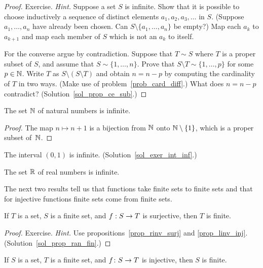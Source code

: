\begin{proof} Exercise. \emph{Hint.}  Suppose a set $S$ is infinite. Show that it is possible to
choose inductively a sequence of distinct elements $a_1, a_2, a_3,\dots$ in $S$. (Suppose
$a_1,\dots,a_n$ have already been chosen. Can $S \setminus \{a_1,\dots,a_n\}$ be empty?)  Map
each $a_k$ to $a_{k+1}$ and map each member of $S$ which is not an $a_k$ to itself.

For the converse argue by contradiction.  Suppose that $T \sim S$ where $T$ is a proper subset
of $S$, and assume that $S \sim \{1,\dots,n\}$.  Prove that $S \setminus T \sim \{1,\dots,p\}$
for some $p \in \mathbb{N}$. Write $T$ as $S \setminus (S \setminus T)$ and obtain $n = n - p$ by
computing the cardinality of $T$ in two ways. (Make use of problem~\ref{prob_card_diff}.) What
does $n = n - p$ contradict?  (Solution~\ref{sol_prop_ce_sub}.)  \ns
\end{proof}

\begin{exam} The set $\mathbb{N}$ of natural numbers is infinite.
\end{exam}

\begin{proof}  The map $n \mapsto n + 1$ is a bijection from $\mathbb{N}$ onto $\mathbb{N} \setminus \{1\}$,
which is a proper subset of~$\mathbb{N}$.
\end{proof}

\begin{exer}\label{exer_int_inf}  The interval $(0,1)$ is infinite.
(Solution~\ref{sol_exer_int_inf}.)
\end{exer}

\begin{exam}  The set $\mathbb{R}$ of real numbers is infinite.
\end{exam}

The next two results tell us that functions take finite sets to finite sets and that for
injective functions finite sets come from finite sets.

\begin{prop}\label{prop_ran_fin}  If $T$ is a set, $S$ is a finite set, and $f:S \rightarrow T$ is
surjective, then $T$ is finite.
\end{prop}

\begin{proof} Exercise. \emph{Hint.}  Use propositions~\ref{prop_rinv_surj} and
\ref{prop_linv_inj}.  (Solution~\ref{sol_prop_ran_fin}.) \ns
\end{proof}

\begin{prop}\label{prop_preimg_fin} If $S$ is a set, $T$ is a finite set, and $f \colon S \rightarrow T$
is injective, then $S$ is finite.
\end{prop}

